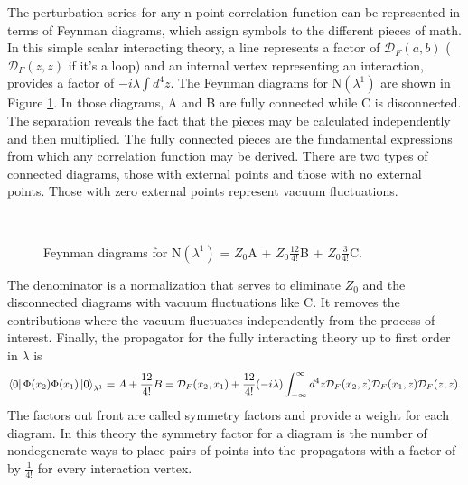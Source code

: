 The perturbation series for any n-point correlation function can be represented in terms of Feynman diagrams, which assign symbols to the different pieces of math. In this simple scalar interacting theory, a line represents a factor of $\mathcal{D}_F(a,b)$ ($\mathcal{D}_F(z,z)$ if it's a loop) and an internal vertex representing an interaction, provides a factor of $-i\lambda\int d^4z$. The Feynman diagrams for N$(\lambda^1)$ are shown in Figure \ref{fig:feynfullprop}. In those diagrams, A and B are fully connected while C is disconnected. The separation reveals the fact that the pieces may be calculated independently and then multiplied. The fully connected pieces are the fundamental expressions from which any correlation function may be derived. There are two types of connected diagrams, those with external points and those with no external points. Those with zero external points represent vacuum fluctuations.
\begin{figure}[htbp]
     \centering
   \mbox{
       \qquad
       \qquad
       \qquad
     }
    \caption[Feynman diagrams for the Numerator N$(\lambda^1)$ = $Z_0$A + $Z_0$B + $Z_0$C.]
    {Feynman diagrams for N$(\lambda^1)$ = $Z_0$A + $Z_0\frac{12}{4!}$B + $Z_0\frac{3}{4!}$C.}
    \label{fig:feynfullprop}
\end{figure}
The denominator is a normalization that serves to eliminate $Z_0$ and the disconnected diagrams with vacuum fluctuations like C. It removes the contributions where the vacuum fluctuates independently from the process of interest. Finally, the propagator for the fully interacting theory up to first order in $\lambda$ is 
\begin{equation}
\bra{0}\Phi(x_2)\Phi(x_1)\ket{0}_{\lambda^1} = A + \frac{12}{4!}B = \mathcal{D}_F(x_2,x_1) + 
\frac{12}{4!}(-i\lambda)\int_{-\infty}^{\infty} d^4z \mathcal{D}_F(x_2,z) \mathcal{D}_F(x_1,z) \mathcal{D}_F(z,z).
\end{equation}
The factors out front are called symmetry factors and provide a weight for each diagram. In this theory the symmetry factor for a diagram is the number of nondegenerate ways to place pairs of points into the propagators with a factor of by $\frac{1}{4!}$ for every interaction vertex. 

